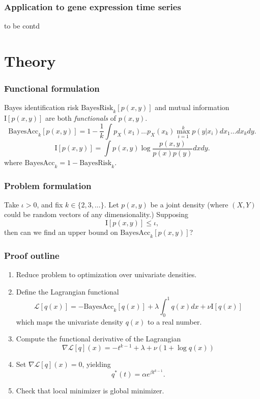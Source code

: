 \documentclass{beamer}
\begin{document}
\begin{frame}
\frametitle{Application to gene expression time series}
to be contd
\end{frame}

\section{Theory}

\begin{frame}
\sectionpage
\end{frame}


\begin{frame}
\frametitle{Functional formulation}
Bayes identification risk $\text{BayesRisk}_k[p(x, y)]$ and mutual information $\text{I}[p(x, y)]$ are both \emph{functionals} of $p(x, y)$.
\[
\text{BayesAcc}_k[p(x, y)] = 1 - \frac{1}{k} \int p_X(x_1)\hdots p_X(x_k) \max_{i=1}^k p(y|x_i)  dx_1\hdots dx_k dy.
\]
\[
\text{I}[p(x, y)] = \int p(x, y) \log \frac{p(x, y)}{p(x)p(y)} dx dy.
\]
where $\text{BayesAcc}_k = 1 - \text{BayesRisk}_k$.
\end{frame}

\begin{frame}
\frametitle{Problem formulation} Take $\iota > 0$, and fix $k \in
\{2,3,...\}$.  Let $p(x, y)$ be a joint density (where $(X, Y)$
could be random vectors of any dimensionality.)  Supposing
\[
\text{I}[p(x, y)] \leq \iota,
\]
then can we find an upper bound on $\text{BayesAcc}_k[p(x, y)]$?

\end{frame}

\begin{frame}
\frametitle{Proof outline}
\begin{enumerate}
\item Reduce problem to optimization over univariate densities.
\item Define the Lagrangian functional
\[
\mathcal{L}[q(x)] = -\text{BayesAcc}_k[q(x)] + \lambda \int_0^1 q(x) dx + \nu \text{I}[q(x)]
\]
which maps the univariate density $q(x)$ to a real number.
\item Compute the functional derivative of the Lagrangian
\[
\nabla \mathcal{L}[q](x) = -t^{k-1} + \lambda + \nu (1 + \log q(x))
\]
\item Set $\nabla \mathcal{L}[q](x) = 0$, yielding
\[
q^*(t) = \alpha e^{\beta t^{k-1}}.
\]
\item Check that local minimizer is global minimizer.
\end{enumerate}
\end{frame}
\end{document}
